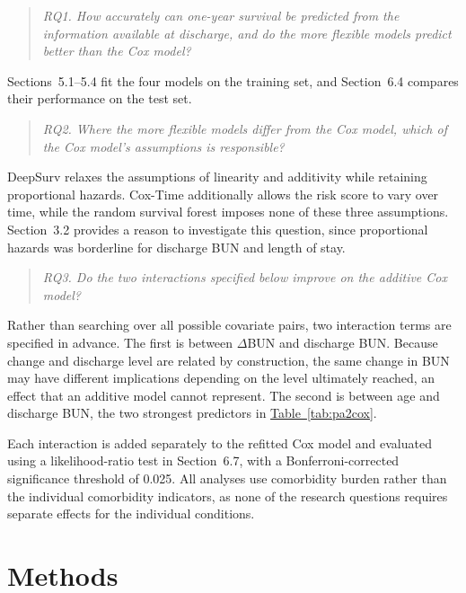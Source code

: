 \documentclass[11pt,a4paper]{article}
\newcommand{\tabref}[1]{\hyperref[#1]{Table~\ref*{#1}}}
\newcommand{\dbun}{$\Delta$BUN}
\begin{document}
\begin{quote}\itshape
RQ1. How accurately can one-year survival be predicted from the information available at
discharge, and do the more flexible models predict better than the Cox model?
\end{quote}

Sections~5.1--5.4 fit the four models on the training set, and Section~6.4 compares their performance on the test set.

\begin{quote}\itshape
RQ2. Where the more flexible models differ from the Cox model, which of the Cox model's
assumptions is responsible?
\end{quote}

DeepSurv relaxes the assumptions of linearity and additivity while retaining proportional hazards. Cox-Time additionally allows the risk score to vary over time, while the random survival forest imposes none of these three assumptions. Section~3.2 provides a reason to investigate this question, since proportional hazards was borderline for discharge BUN and length of stay.

\begin{quote}\itshape
RQ3. Do the two interactions specified below improve on the additive Cox model?
\end{quote}

Rather than searching over all possible covariate pairs, two interaction terms are specified in advance. The first is between \dbun{} and discharge BUN. Because change and discharge level are related by construction, the same change in BUN may have different implications depending on the level ultimately reached, an effect that an additive model cannot represent. The second is between age and discharge BUN, the two strongest predictors in \tabref{tab:pa2cox}.

Each interaction is added separately to the refitted Cox model and evaluated using a likelihood-ratio test in Section~6.7, with a Bonferroni-corrected significance threshold of 0.025. All analyses use comorbidity burden rather than the individual comorbidity indicators, as none of the research questions requires separate effects for the individual conditions.


\section{Methods}
\end{document}
